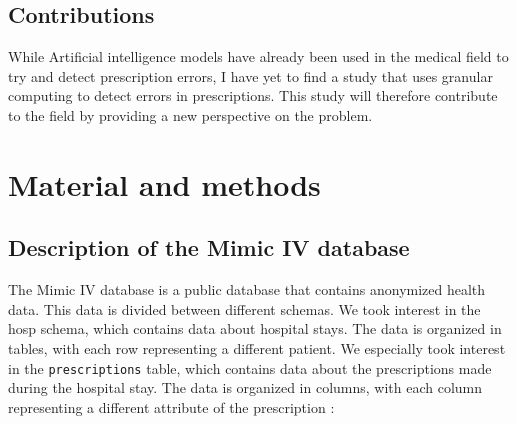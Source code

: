 \documentclass[a4paper,12pt]{article}
\begin{document}
\subsection{Contributions}

While Artificial intelligence models have already been used in the medical field to try and detect prescription errors, I have yet to find a study that uses granular computing to detect errors in prescriptions. This study will therefore contribute to the field by providing a new perspective on the problem.

\section{Material and methods}
\subsection{Description of the Mimic IV database}

The Mimic IV database is a public database that contains anonymized health data. This data is divided between different schemas. We took interest in the hosp schema, which contains data about hospital stays. The data is organized in tables, with each row representing a different patient. We especially took interest in the \texttt{prescriptions} table, which contains data about the prescriptions made during the hospital stay. The data is organized in columns, with each column representing a different attribute of the prescription :

\renewcommand{\arraystretch}{1.2} %
\end{document}
